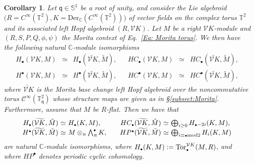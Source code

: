 \documentclass[reqno, a4paper, 10pt]{amsart}
\numberwithin{equation}{section}
\theoremstyle{plain}
\newtheorem{cor}[theorem]{Corollary}
\theoremstyle{definition}
\theoremstyle{remark}
\begin{document}
{
\begin{cor}
Let ${\mathsf{{q}}} \in \mathbb{S}^1$ be a root of unity,
and consider the Lie algebroid $\big(R=C^\infty(\mathbb{T}^2),K = {\mathrm{Der}}_{{\mathbb{C}}}(C^\infty(\mathbb{T}^2))\big)$ of vector fields on the complex torus $\mathbb{T}^2$ and its associated left Hopf algebroid $(R,{{\mathcal V}} K)$. 
Let $M$ be a right ${{\mathcal V}} K$-module 
and $(R,S,P,Q,\phi,\psi)$ the Morita context of Eq.~\eqref{Eq: Morita torus}. 
We then have the following natural ${{\mathbb{C}}}$-module isomorphisms
$$
\begin{array}{rclcrcl}
H_{{\scriptscriptstyle{\bullet}}}({{\mathcal V}} K , M) &\simeq & H_{{\scriptscriptstyle{\bullet}}}( \widetilde{{{\mathcal V}} K}, {\tilde{{M}}}), && HC_{{\scriptscriptstyle{\bullet}}}({{\mathcal V}} K, M) &\simeq& HC_{{\scriptscriptstyle{\bullet}}}( \widetilde{{{\mathcal V}} K}, {\tilde{{M}}}), \\
H^{{\scriptscriptstyle{\bullet}}}({{\mathcal V}} K , M) &\simeq & H^{{\scriptscriptstyle{\bullet}}}( \widetilde{{{\mathcal V}} K}, {\tilde{{M}}}), && HC^{{\scriptscriptstyle{\bullet}}}({{\mathcal V}} K, M) &\simeq& HC^{{\scriptscriptstyle{\bullet}}}( \widetilde{{{\mathcal V}} K}, {\tilde{{M}}}), 
\end{array}
$$
where $\widetilde{{{\mathcal V}} K}$ is the Morita base change left Hopf algebroid over the noncommutative torus ${{\mathcal C}}^{\infty}(\mathbb{T}_{{\mathsf{{q}}}}^2)$ whose structure maps are given as in \S\ref{subsect:Morita}.\\
Furthermore,  assume that $M$ be $R$-flat. Then we have that
$$
\begin{array}{rclcrcl}
H_{{\scriptscriptstyle{\bullet}}}( \widetilde{{{\mathcal V}} K}, {\tilde{{M}}}) &\!\!\!\!\simeq&\!\!\!\!  H_{{\scriptscriptstyle{\bullet}}}(K, M), && 
HC_{{\scriptscriptstyle{\bullet}}}( \widetilde{{{\mathcal V}} K}, {\tilde{{M}}}) &\!\!\!\!\simeq&\!\!\!\! \textstyle\bigoplus_{i \geq 0}H_{{{\scriptscriptstyle{\bullet}}} -2i}(K,M), \\
H^{{\scriptscriptstyle{\bullet}}}( \widetilde{{{\mathcal V}} K}, {\tilde{{M}}}) &\!\!\!\!\simeq&\!\!\!\!  M \otimes_{{\scriptscriptstyle{R}}} \textstyle\bigwedge^{{\scriptscriptstyle{\bullet}}}_{{\scriptscriptstyle{R}}} K, && 
HP^{{\scriptscriptstyle{\bullet}}}( \widetilde{{{\mathcal V}} K}, {\tilde{{M}}}) &\!\!\!\!\simeq&\!\!\!\! \textstyle\bigoplus_{i \equiv {{\scriptscriptstyle{\bullet}}} {\rm mod} 2}H_{i}(K,M) \\
\end{array}
$$ 
are natural $\mathbb{C}$-module isomorphisms,
where $H_{{\scriptscriptstyle{\bullet}}}(K, M) :=  {{\rm Tor}}^{{{\mathcal V}} K}_{{\scriptscriptstyle{\bullet}}}(M, R)$,
 and where $HP^{{\scriptscriptstyle{\bullet}}}$ denotes periodic cyclic cohomology.
\end{cor}
}
\end{document}
